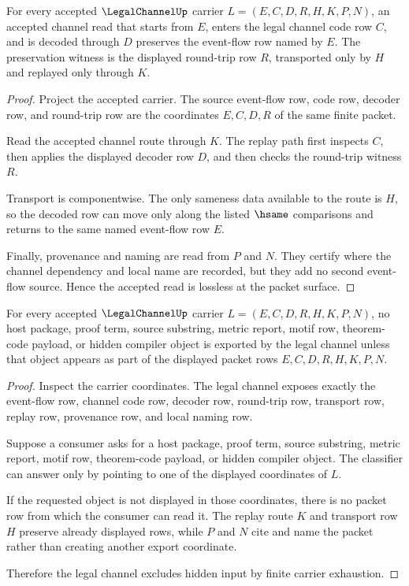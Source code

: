 \begin{theorem}
\label{thm:legal-channel-lossless-namecert}
For every accepted $\LegalChannelUp$ carrier $L=(E,C,D,R,H,K,P,N)$, an accepted channel read that starts from $E$, enters the legal channel code row $C$, and is decoded through $D$ preserves the event-flow row named by $E$. The preservation witness is the displayed round-trip row $R$, transported only by $H$ and replayed only through $K$.
\end{theorem}
\begin{proof}
Project the accepted carrier. The source event-flow row, code row, decoder row, and round-trip row are the coordinates $E,C,D,R$ of the same finite packet.

Read the accepted channel route through $K$. The replay path first inspects $C$, then applies the displayed decoder row $D$, and then checks the round-trip witness $R$.

Transport is componentwise. The only sameness data available to the route is $H$, so the decoded row can move only along the listed $\hsame$ comparisons and returns to the same named event-flow row $E$.

Finally, provenance and naming are read from $P$ and $N$. They certify where the channel dependency and local name are recorded, but they add no second event-flow source. Hence the accepted read is lossless at the packet surface.
\end{proof}

\begin{theorem}
\label{thm:legal-channel-hidden-input-exclusion}
For every accepted $\LegalChannelUp$ carrier $L=(E,C,D,R,H,K,P,N)$, no host package, proof term, source substring, metric report, motif row, theorem-code payload, or hidden compiler object is exported by the legal channel unless that object appears as part of the displayed packet rows $E,C,D,R,H,K,P,N$.
\end{theorem}
\begin{proof}
Inspect the carrier coordinates. The legal channel exposes exactly the event-flow row, channel code row, decoder row, round-trip row, transport row, replay row, provenance row, and local naming row.

Suppose a consumer asks for a host package, proof term, source substring, metric report, motif row, theorem-code payload, or hidden compiler object. The classifier can answer only by pointing to one of the displayed coordinates of $L$.

If the requested object is not displayed in those coordinates, there is no packet row from which the consumer can read it. The replay route $K$ and transport row $H$ preserve already displayed rows, while $P$ and $N$ cite and name the packet rather than creating another export coordinate.

Therefore the legal channel excludes hidden input by finite carrier exhaustion.
\end{proof}

